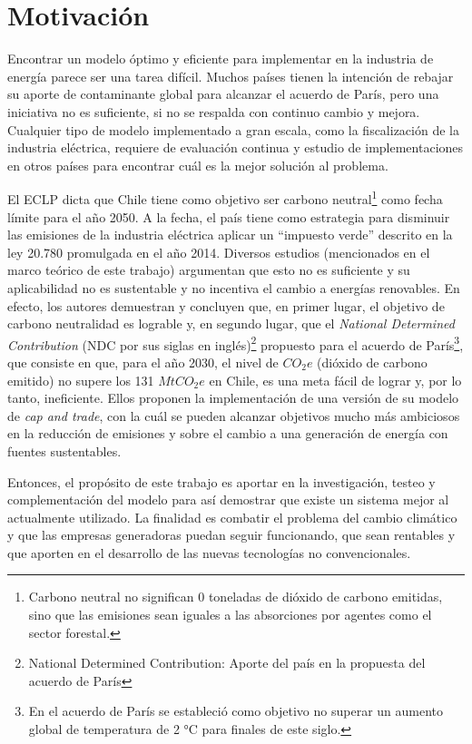 \section{Motivación}
Encontrar un modelo óptimo y eficiente para implementar en la industria de energía parece ser una tarea difícil. Muchos países tienen la intención de rebajar su aporte de contaminante global para alcanzar el acuerdo de París, pero una iniciativa no es suficiente, si no se respalda con continuo cambio y mejora. Cualquier tipo de modelo implementado a gran escala, como la fiscalización de la industria eléctrica, requiere de evaluación continua y estudio de implementaciones en otros países para encontrar cuál es la mejor solución al problema.
\vspace{2.5mm}

El ECLP dicta que Chile tiene como objetivo ser carbono neutral\footnote{Carbono neutral no significan 0 toneladas de dióxido de carbono emitidas, sino que las emisiones sean iguales a las absorciones por agentes como el sector forestal.} como fecha límite para el año 2050. A la fecha, el país tiene como estrategia para disminuir las emisiones de la industria eléctrica aplicar un ``impuesto verde'' descrito en la ley 20.780 promulgada en el año 2014. Diversos estudios (mencionados en el marco teórico de este trabajo) argumentan que esto no es suficiente y su aplicabilidad no es sustentable y no incentiva el cambio a energías renovables. En efecto, los autores  demuestran y concluyen que, en primer lugar, el objetivo de carbono neutralidad es lograble y, en segundo lugar, que el \emph{National Determined Contribution}  (NDC por sus siglas en inglés)\footnote{National Determined Contribution: Aporte del país en la propuesta del acuerdo de París}  propuesto para el acuerdo de París\footnote{En el acuerdo de París se estableció como objetivo no superar un aumento global de temperatura de 2 °C para finales de este siglo.}, que consiste en que, para el año 2030, el nivel de $CO_2 e$ (dióxido de carbono emitido) no supere los 131 $MtCO_2 e$ en Chile, es una meta fácil de lograr y, por lo tanto, ineficiente. Ellos proponen la implementación de una versión de su modelo de \emph{cap and trade}, con la cuál se pueden alcanzar objetivos mucho más ambiciosos en la reducción de emisiones y sobre el cambio a una generación de energía con fuentes sustentables.
\vspace{2.5mm}

Entonces, el propósito de este trabajo es aportar en la investigación, testeo y complementación del modelo para así demostrar que existe un sistema mejor al actualmente utilizado. La finalidad es combatir el problema del cambio climático y que las empresas generadoras puedan seguir funcionando, que sean rentables y que aporten en el desarrollo de las nuevas tecnologías no convencionales.


